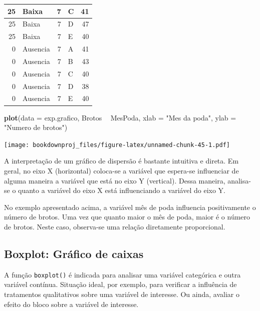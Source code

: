 \documentclass[
]{article}
\newenvironment{Shaded}{\begin{snugshade}}{\end{snugshade}}
\newcommand{\DataTypeTok}[1]{\textcolor[rgb]{0.13,0.29,0.53}{#1}}
\newcommand{\KeywordTok}[1]{\textcolor[rgb]{0.13,0.29,0.53}{\textbf{#1}}}
\newcommand{\NormalTok}[1]{#1}
\newcommand{\OperatorTok}[1]{\textcolor[rgb]{0.81,0.36,0.00}{\textbf{#1}}}
\newcommand{\StringTok}[1]{\textcolor[rgb]{0.31,0.60,0.02}{#1}}
\begin{document}
\begin{table}
\begin{tabular}[t]{r|l|r|l|r}
\hline
25 & Baixa & 7 & C & 41\\
\hline
25 & Baixa & 7 & D & 47\\
\hline
25 & Baixa & 7 & E & 40\\
\hline
0 & Ausencia & 7 & A & 41\\
\hline
0 & Ausencia & 7 & B & 43\\
\hline
0 & Ausencia & 7 & C & 40\\
\hline
0 & Ausencia & 7 & D & 38\\
\hline
0 & Ausencia & 7 & E & 40\\
\hline
\end{tabular}
\end{table}

\begin{Shaded}
\begin{Highlighting}[]
\KeywordTok{plot}\NormalTok{(}\DataTypeTok{data =}\NormalTok{ exp.grafico, Brotos }\OperatorTok{~}\StringTok{ }\NormalTok{MesPoda, }
     \DataTypeTok{xlab =} \StringTok{"Mes da poda"}\NormalTok{, }
     \DataTypeTok{ylab =} \StringTok{"Numero de brotos"}\NormalTok{)}
\end{Highlighting}
\end{Shaded}

\texttt{[image: bookdownproj\_files/figure-latex/unnamed-chunk-45-1.pdf]}

A interpretação de um gráfico de dispersão é bastante intuitiva e direta. Em geral, no eixo X (horizontal) coloca-se a variável que espera-se influenciar de alguma maneira a variável que está no eixo Y (vertical). Dessa maneira, analisa-se o quanto a variável do eixo X está influenciando a variável do eixo Y.

No exemplo apresentado acima, a variável mês de poda influencia positivamente o número de brotos. Uma vez que quanto maior o mês de poda, maior é o número de brotos. Neste caso, observa-se uma relação diretamente proporcional.

\hypertarget{boxplot-gruxe1fico-de-caixas}{%
\subsection{Boxplot: Gráfico de caixas}\label{boxplot-gruxe1fico-de-caixas}}

A função \texttt{boxplot()} é indicada para analisar uma variável categórica e outra variável contínua. Situação ideal, por exemplo, para verificar a influência de tratamentos qualitativos sobre uma variável de interesse. Ou ainda, avaliar o efeito do bloco sobre a variável de interesse.
\end{document}
